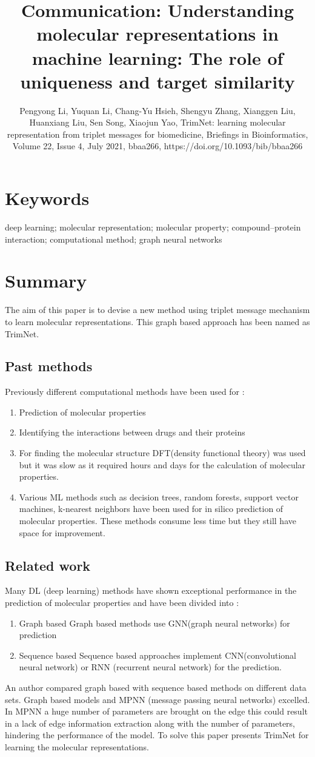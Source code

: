 \documentclass[12pt]{osa-supplemental-document}
\title{Communication: Understanding molecular
representations in machine learning: The
role of uniqueness and target similarity}
\author{Pengyong Li, Yuquan Li, Chang-Yu Hsieh, Shengyu Zhang, Xianggen Liu, Huanxiang Liu, Sen Song, Xiaojun Yao, TrimNet: learning molecular representation from triplet messages for biomedicine, Briefings in Bioinformatics, Volume 22, Issue 4, July 2021, bbaa266, https://doi.org/10.1093/bib/bbaa266}
\begin{document}
\maketitle

\section*{Keywords}

deep learning; molecular representation; molecular property; compound–protein interaction; computational
method; graph neural networks


\section*{Summary}
The aim of this paper is to devise a new method using triplet message mechanism to learn molecular representations. This graph based approach has been named as TrimNet.

\subsection*{Past methods}
Previously different computational methods have been used for :
\begin{enumerate}
    \item Prediction of molecular properties
    \item Identifying the interactions between drugs and their proteins
    \item For finding the molecular structure DFT(density functional theory) was used but it was slow as it required hours and days for the calculation of molecular properties.
    \item Various ML methods such as decision trees, random forests, support vector machines, k-nearest neighbors have been used for in silico prediction of molecular properties. These methods consume less time but they still have space for improvement.
\end{enumerate}

\subsection*{Related work}
Many DL (deep learning) methods have shown exceptional performance in the prediction of molecular properties and have been divided into :
\begin{enumerate}
    \item Graph based
    Graph based methods use GNN(graph neural networks) for prediction
    \item Sequence based 
   Sequence based approaches implement CNN(convolutional neural network) or RNN (recurrent neural network) for the prediction.
\end{enumerate}
An author compared graph based with sequence based methods on different data sets. Graph based models and MPNN (message passing neural networks) excelled. In MPNN a huge number of parameters are brought on the edge this could result in a lack of edge information extraction along with the number of parameters, hindering the performance of the model. To solve this paper presents TrimNet for learning the molecular representations. 
\end{document}
